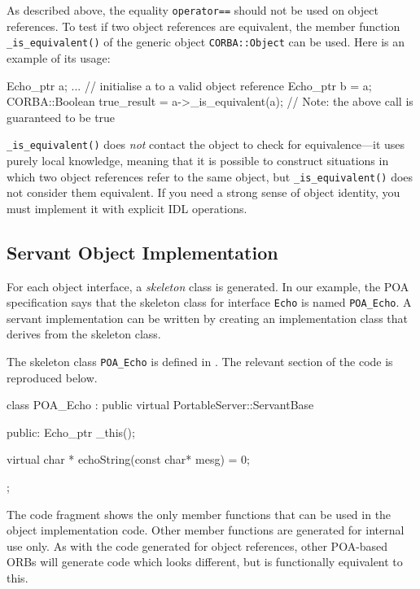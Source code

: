 \documentclass[11pt,oneside,a4paper]{book}
\newcommand{\type}[1]{\texttt{#1}}
\newcommand{\intf}[1]{\texttt{#1}}
\newcommand{\code}[1]{\texttt{#1}}
\newcommand{\op}[1]{\texttt{#1()}}
\newcommand{\term}[1]{\textit{#1}}
\begin{document}
As described above, the equality \code{operator==} should not be used
on object references. To test if two object references are equivalent,
the member function \op{\_is\_equivalent} of the generic object
\type{CORBA::Object} can be used. Here is an example of its usage:

\begin{cxxlisting}
Echo_ptr a;
...            // initialise a to a valid object reference 
Echo_ptr b = a;
CORBA::Boolean true_result = a->_is_equivalent(a); 
// Note: the above call is guaranteed to be true
\end{cxxlisting}

\op{\_is\_equivalent} does \emph{not} contact the object to check for
equivalence---it uses purely local knowledge, meaning that it is
possible to construct situations in which two object references refer
to the same object, but \op{\_is\_equivalent} does not consider them
equivalent. If you need a strong sense of object identity, you must
implement it with explicit IDL operations.


\subsection{Servant Object Implementation}
\label{stubobjimpl}

For each object interface, a \term{skeleton} class is generated.  In
our example, the POA specification says that the skeleton class for
interface \intf{Echo} is named \type{POA\_Echo}. A servant
implementation can be written by creating an implementation class that
derives from the skeleton class.

The skeleton class \type{POA\_Echo} is defined in . The
relevant section of the code is reproduced below.

\begin{cxxlisting}
class POA_Echo :
  public virtual PortableServer::ServantBase
{
public:
  Echo_ptr _this();

  virtual char * echoString(const char* mesg) = 0;
};
\end{cxxlisting}

The code fragment shows the only member functions that can be used in
the object implementation code. Other member functions are generated
for internal use only. As with the code generated for object
references, other POA-based ORBs will generate code which looks
different, but is functionally equivalent to this.
\end{document}
